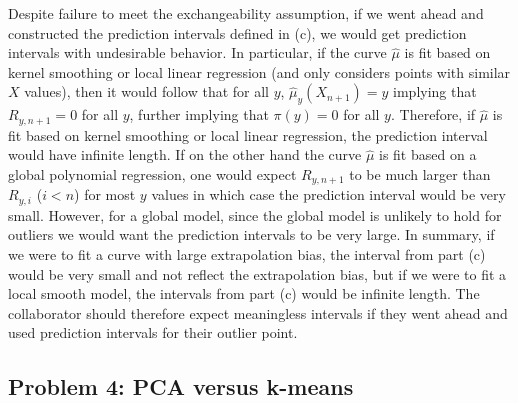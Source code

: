 \begin{enumerate}
Despite failure to meet the exchangeability assumption, if we went ahead and constructed the prediction intervals defined in (c), we would get prediction intervals with undesirable behavior. In particular, if the curve $\hat{\mu}$ is fit based on kernel smoothing or local linear regression (and only considers points with similar $X$ values), then it would follow that for all $y$, $\hat{\mu}_y(X_{n+1})= y$ implying that $R_{y,n+1}=0$ for all $y$, further implying that $\pi(y)=0$ for all $y$. Therefore, if $\hat{\mu}$ is fit based on kernel smoothing or local linear regression, the prediction interval would have infinite length. If on the other hand the curve $\hat{\mu}$ is fit based on a global polynomial regression, one would expect $R_{y,n+1}$ to be much larger than $R_{y,i}$  ($i <n$) for most $y$ values in which case the prediction interval would be very small. However, for a global model, since the global model is unlikely to hold for outliers we would want the prediction intervals to be very large. In summary, if we were to fit a curve with large extrapolation bias, the interval from part (c) would be very small and not reflect the extrapolation bias, but if we were to fit a local smooth model, the intervals from part (c) would be infinite length. The collaborator should therefore expect meaningless intervals if they went ahead and used prediction intervals for their outlier point. 

\end{enumerate}



\subsection*{Problem 4: PCA versus k-means}

